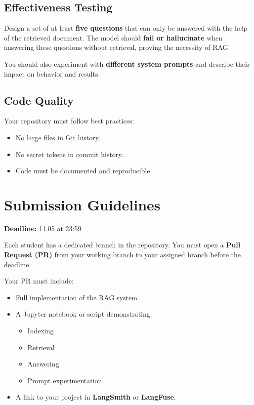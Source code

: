 \documentclass[12pt]{article}
\begin{document}
\subsection*{Effectiveness Testing}
Design a set of at least \textbf{five questions} that can only be answered with the help of the retrieved document. The model should \textbf{fail or hallucinate} when answering these questions without retrieval, proving the necessity of RAG.

You should also experiment with \textbf{different system prompts} and describe their impact on behavior and results.

\subsection*{Code Quality}
Your repository must follow best practices:
\begin{itemize}[noitemsep]
  \item No large files in Git history.
  \item No secret tokens in commit history.
  \item Code must be documented and reproducible.
\end{itemize}

\section*{Submission Guidelines}

\textcolor{linkblue}{\textbf{Deadline:} 11.05 at 23:59}

Each student has a dedicated branch in the repository. You must open a \textcolor{linkblue}{\textbf{Pull Request (PR)}} from your working branch to your assigned branch before the deadline.

Your PR must include:
\begin{itemize}[noitemsep]
  \item Full implementation of the RAG system.
  \item A Jupyter notebook or script demonstrating:
    \begin{itemize}[noitemsep]
      \item Indexing
      \item Retrieval
      \item Answering
      \item Prompt experimentation
    \end{itemize}
  \item A link to your project in \textbf{LangSmith} or \textbf{LangFuse}.
\end{itemize}
\end{document}
